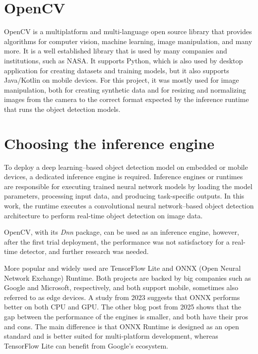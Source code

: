 \section{OpenCV}
OpenCV \cite{opencv} is a multiplatform and multi-language open source library that provides algorithms for computer vision, machine learning, image manipulation, and many more. It is a well established library that is used by many companies and institutions, such as NASA. It supports Python, which is also used by desktop application for creating datasets and training models, but it also supports Java/Kotlin on mobile devices.  For this project, it was mostly used for image manipulation, both for creating synthetic data and for resizing and normalizing images from the camera to the correct format expected by the inference runtime that runs the object detection models.



\section{Choosing the inference engine}
To deploy a deep learning–based object detection model on embedded or mobile devices, a dedicated inference engine is required. Inference engines or runtimes are responsible for executing trained neural network models by loading the model parameters, processing input data, and producing task-specific outputs. In this work, the runtime executes a convolutional neural network–based object detection architecture to perform real-time object detection on image data.

OpenCV, with its \textit{Dnn} package, can be used as an inference engine, however, after the first trial deployment, the performance was not satisfactory for a real-time detector, and further research was needed. 

More popular and widely used are TensorFlow Lite and ONNX (Open Neural Network Exchange) Runtime. Both projects are backed by big companies such as Google and Microsoft, respectively, and both support mobile, sometimes also referred to as edge devices. A study from 2023 \cite{Ren2023_ONNX_TensorFlow_BScan} suggests that ONNX performs better on both CPU and GPU. The other blog post \cite{aimtechnoOnnxTFcomparison} from 2025 shows that the gap between the performance of the engines is smaller, and both have their pros and cons. The main difference is that ONNX Runtime is designed as an open standard and is better suited for multi-platform development, whereas TensorFlow Lite can benefit from Google's ecosystem.

